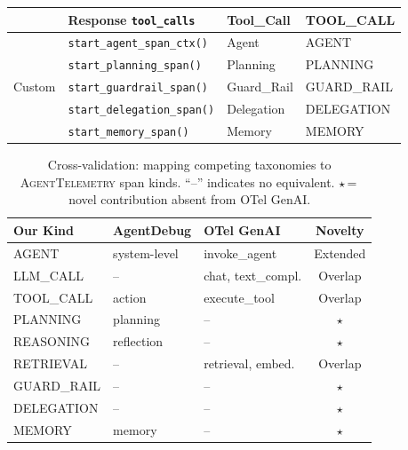 \documentclass[sigplan,10pt,screen]{acmart}
\begin{document}
\begin{table}[t]
\begin{tabular}{@{}llll@{}}
  & Response \texttt{tool\_calls} & Tool\_Call & TOOL\_CALL \\
\midrule
\multirow{5}{*}{Custom}
  & \texttt{start\_agent\_span\_ctx()} & Agent & AGENT \\
  & \texttt{start\_planning\_span()} & Planning & PLANNING \\
  & \texttt{start\_guardrail\_span()} & Guard\_Rail & GUARD\_RAIL \\
  & \texttt{start\_delegation\_span()} & Delegation & DELEGATION \\
  & \texttt{start\_memory\_span()} & Memory & MEMORY \\
\bottomrule
\end{tabular}
\end{table}

\begin{table}[t]
\centering
\small
\caption{Cross-validation: mapping competing taxonomies to
\textsc{AgentTelemetry} span kinds.  ``--'' indicates no equivalent.
$\star$\,=\,novel contribution absent from OTel GenAI.}
\label{tab:taxonomy_comparison}
\begin{tabular}{@{}lllc@{}}
\toprule
\textbf{Our Kind} & \textbf{AgentDebug} & \textbf{OTel GenAI} & \textbf{Novelty} \\
\midrule
AGENT       & system-level  & invoke\_agent    & Extended \\
LLM\_CALL   & --            & chat, text\_compl. & Overlap \\
TOOL\_CALL  & action        & execute\_tool    & Overlap \\
PLANNING    & planning      & --               & $\star$ \\
REASONING   & reflection    & --               & $\star$ \\
RETRIEVAL   & --            & retrieval, embed. & Overlap \\
GUARD\_RAIL & --            & --               & $\star$ \\
DELEGATION  & --            & --               & $\star$ \\
MEMORY      & memory        & --               & $\star$ \\
\bottomrule
\end{tabular}
\end{table}
\end{document}
